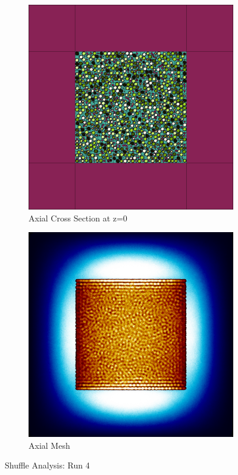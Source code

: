 \begin{figure}[H]
\begin{subfigure}{0.45\textwidth}
  \includegraphics[width=0.95\linewidth]{figures/4560123/4560123-v}
  \caption{Axial Cross Section at z=0 }
  \label{fig:4560123-v}
\end{subfigure}
%
\begin{subfigure}{0.45\textwidth}
  \includegraphics[width=0.95\linewidth]{figures/4560123/4560123-vm}
  \caption{Axial Mesh}
  \label{fig:4560123-vm}
\end{subfigure}
%
\caption{Shuffle Analysis: Run 4}
\label{fig:4560123}
\end{figure}